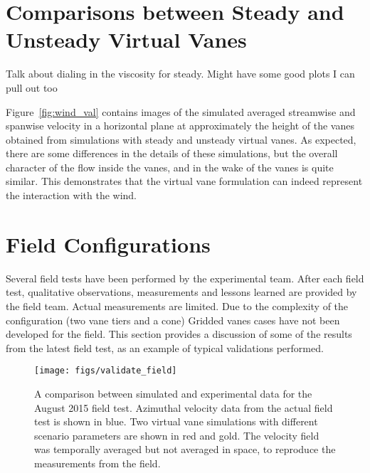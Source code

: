 \section{Comparisons between Steady and Unsteady Virtual Vanes}
\label{sec:steady_val}

Talk about dialing in the viscosity for steady. Might have some good
plots I can pull out too

Figure~\ref{fig:wind_val} contains images of the simulated averaged
streamwise and  spanwise velocity in a horizontal plane at approximately
the height of the vanes obtained from simulations with steady and
unsteady virtual vanes. As expected, there are some differences in the
details of these simulations, but the overall character of the flow
inside the vanes, and in the wake of the vanes is quite similar. This
demonstrates that the virtual vane formulation can indeed represent the
interaction with the wind. 

\section{Field Configurations}
\label{sec:field_val}

Several field tests have been performed by the experimental team. After
each field test, qualitative observations, measurements and lessons
learned are provided by the field team. Actual measurements
are limited. Due to the complexity of the configuration
(two vane tiers and a cone) Gridded vanes cases have not been developed 
for the field. This section provides a discussion of some of
the results from the latest field test, as an example of typical
validations performed. 

 \begin{figure}[!htb]
  \begin{center}
   \texttt{[image: figs/validate\_field]}
   \caption{A comparison between simulated and experimental data for the
   August 2015 field test. Azimuthal velocity data from the actual field
   test is shown in blue. Two virtual vane simulations with different
   scenario parameters are shown in red and gold. The velocity field was
   temporally averaged but not averaged in space, to reproduce
   the measurements from the field.}
   \label{fig:field_val}
  \end{center}
 \end{figure}
%
%

